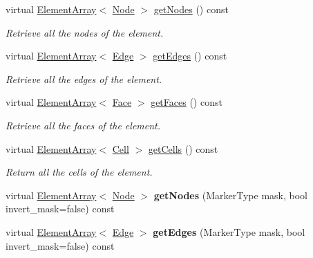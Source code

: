 \begin{DoxyCompactItemize}
\item 
virtual \hyperlink{classINMOST_1_1ElementArray}{Element\-Array}$<$ \hyperlink{classINMOST_1_1Node}{Node} $>$ \hyperlink{classINMOST_1_1Element_a00696ff8cd77491e1c4307cae166e92d}{get\-Nodes} () const 
\begin{DoxyCompactList}\small\item\em Retrieve all the nodes of the element. \end{DoxyCompactList}\item 
virtual \hyperlink{classINMOST_1_1ElementArray}{Element\-Array}$<$ \hyperlink{classINMOST_1_1Edge}{Edge} $>$ \hyperlink{classINMOST_1_1Element_a3ba56a19eeeb283864a006b0744fac4e}{get\-Edges} () const 
\begin{DoxyCompactList}\small\item\em Retrieve all the edges of the element. \end{DoxyCompactList}\item 
virtual \hyperlink{classINMOST_1_1ElementArray}{Element\-Array}$<$ \hyperlink{classINMOST_1_1Face}{Face} $>$ \hyperlink{classINMOST_1_1Element_a2d9cc22d44f8d70c5b2876d84be6dfa5}{get\-Faces} () const 
\begin{DoxyCompactList}\small\item\em Retrieve all the faces of the element. \end{DoxyCompactList}\item 
virtual \hyperlink{classINMOST_1_1ElementArray}{Element\-Array}$<$ \hyperlink{classINMOST_1_1Cell}{Cell} $>$ \hyperlink{classINMOST_1_1Element_aa90ec6b1e297fb9c1322b5558ccb7e2d}{get\-Cells} () const 
\begin{DoxyCompactList}\small\item\em Return all the cells of the element. \end{DoxyCompactList}\item 
\hypertarget{classINMOST_1_1Element_afe6bcf4b6d9d3398151abb8dbddc333e}{virtual \hyperlink{classINMOST_1_1ElementArray}{Element\-Array}$<$ \hyperlink{classINMOST_1_1Node}{Node} $>$ {\bfseries get\-Nodes} (Marker\-Type mask, bool invert\-\_\-mask=false) const }\label{classINMOST_1_1Element_afe6bcf4b6d9d3398151abb8dbddc333e}

\item 
\hypertarget{classINMOST_1_1Element_a56a50ffdd0977523410e011e15568e52}{virtual \hyperlink{classINMOST_1_1ElementArray}{Element\-Array}$<$ \hyperlink{classINMOST_1_1Edge}{Edge} $>$ {\bfseries get\-Edges} (Marker\-Type mask, bool invert\-\_\-mask=false) const }\label{classINMOST_1_1Element_a56a50ffdd0977523410e011e15568e52}


\end{DoxyCompactItemize}
